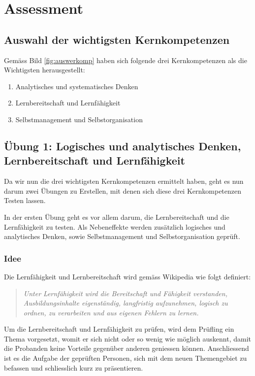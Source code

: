 \chapter{Assessment}\label{Assessment}

\section{Auswahl der wichtigsten Kernkompetenzen}

Gemäss Bild \ref{fig:auswerkomp} haben sich folgende drei Kernkompetenzen als die Wichtigsten herausgestellt:

\begin{enumerate} 
\item{Analytisches und systematisches Denken}
\item{Lernbereitschaft und Lernfähigkeit}
\item{Selbstmanagement und Selbstorganisation}
\end{enumerate}

\section{Übung 1: Logisches und analytisches Denken, Lernbereitschaft und Lernfähigkeit}
Da wir nun die drei wichtigsten Kernkompetenzen ermittelt haben, geht es nun darum zwei Übungen zu Erstellen, mit denen sich diese drei Kernkompetenzen Testen lassen.

In der ersten Übung geht es vor allem darum, die Lernbereitschaft und die Lernfähigkeit zu testen. Als Nebeneffekte werden zusätzlich logisches und analytisches Denken, sowie Selbstmanagement und Selbstorganisation geprüft.

\subsection{Idee}

Die Lernfähigkeit und Lernbereitschaft wird gemäss Wikipedia \cite{wiki:Lernfahigkeit} wie folgt definiert:
\begin{quote} 
\textit{Unter Lernfähigkeit wird die Bereitschaft und Fähigkeit verstanden, Ausbildungsinhalte eigenständig, langfristig aufzunehmen, logisch zu ordnen, zu verarbeiten und aus eigenen Fehlern zu lernen.}
\end{quote}

Um die Lernbereitschaft und Lernfähigkeit zu prüfen, wird dem Prüfling ein Thema vorgesetzt, womit er sich nicht oder so wenig wie möglich auskennt, damit die Probanden keine Vorteile gegenüber anderen geniessen können. Anschliessend ist es die Aufgabe der geprüften Personen, sich mit dem neuen Themengebiet zu befassen und schliesslich kurz zu präsentieren.

